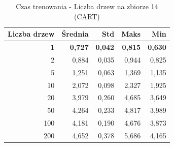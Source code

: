 \begin{table}[htbp]
\centering
\small
\setlength{\tabcolsep}{6pt}
\renewcommand{\arraystretch}{1.2}
\caption{Czas trenowania - Liczba drzew na zbiorze 14 (CART)}
\label{tab:CART_tree_count_14_time}
\begin{tabular}{r|r|r|r|r}
\toprule
Liczba drzew & Średnia & Std & Maks & Min \\
\hline
\textbf{1} & \textbf{0,727} & \textbf{0,042} & \textbf{0,815} & \textbf{0,630} \\
2 & 0,884 & 0,035 & 0,944 & 0,825 \\
5 & 1,251 & 0,063 & 1,369 & 1,135 \\
10 & 2,072 & 0,098 & 2,327 & 1,925 \\
20 & 3,979 & 0,260 & 4,685 & 3,649 \\
50 & 4,264 & 0,233 & 4,817 & 3,989 \\
100 & 4,181 & 0,190 & 4,676 & 3,873 \\
200 & 4,652 & 0,378 & 5,686 & 4,165 \\
\bottomrule
\end{tabular}
\end{table}